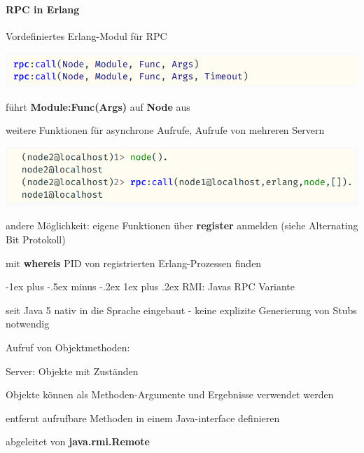 \documentclass[10pt]{article}
\makeatletter
\renewcommand{\subsubsection}{\@startsection{subsubsection}{3}{0mm}%
                                {-1ex plus -.5ex minus -.2ex}%
                                {1ex plus .2ex}%
                                {\normalfont\small\bfseries}}
\makeatother
\begin{document}
\paragraph{RPC in Erlang}

\begin{itemize*}
  \item Vordefiniertes Erlang-Modul für RPC
  \begin{center}
    \includegraphics[width=0.4\linewidth]{Assets/Programmierparadigmen-code-snippet-76}
  \end{center}
  \item führt \textbf{Module:Func(Args)} auf \textbf{Node} aus
  \begin{itemize*}
    \item weitere Funktionen für asynchrone Aufrufe, Aufrufe von mehreren Servern
  \end{itemize*}
  \begin{center}
    \includegraphics[width=0.4\linewidth]{Assets/Programmierparadigmen-code-snippet-77}
  \end{center}
  \item andere Möglichkeit: eigene Funktionen über \textbf{register} anmelden (siehe Alternating Bit Protokoll)
  \item mit \textbf{whereis} PID von registrierten Erlang-Prozessen finden
\end{itemize*}

\subsubsection{RMI: Javas RPC Variante}
\begin{itemize*}
  \item seit Java 5 nativ in die Sprache eingebaut - keine explizite Generierung von Stubs notwendig
  \item Aufruf von Objektmethoden:
  \begin{itemize*}
    \item Server: Objekte mit Zuständen
    \item Objekte können als Methoden-Argumente und Ergebnisse verwendet werden
  \end{itemize*}
  \item entfernt aufrufbare Methoden in einem Java-interface definieren
  \begin{itemize*}
    \item abgeleitet von \textbf{java.rmi.Remote}
  \end{itemize*}
\end{itemize*}
\end{document}
